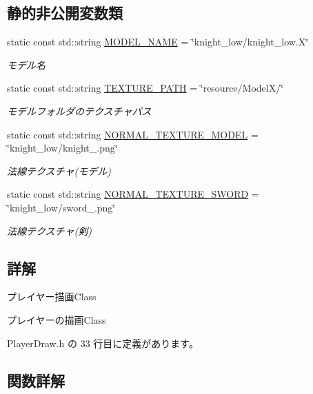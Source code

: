 \subsection*{静的非公開変数類}
\begin{DoxyCompactItemize}
\item 
static const std\+::string \mbox{\hyperlink{class_player_draw_a924cd73d9d8b1b2e662be2c79238354f}{M\+O\+D\+E\+L\+\_\+\+N\+A\+ME}} = \char`\"{}knight\+\_\+low/knight\+\_\+low.\+X\char`\"{}
\begin{DoxyCompactList}\small\item\em モデル名 \end{DoxyCompactList}\item 
static const std\+::string \mbox{\hyperlink{class_player_draw_a808cb174528d55fb35a35b161e262e16}{T\+E\+X\+T\+U\+R\+E\+\_\+\+P\+A\+TH}} = \char`\"{}resource/ModelX/\char`\"{}
\begin{DoxyCompactList}\small\item\em モデルフォルダのテクスチャパス \end{DoxyCompactList}\item 
static const std\+::string \mbox{\hyperlink{class_player_draw_a509edc24db83efdfeda88f12d1d6cc8c}{N\+O\+R\+M\+A\+L\+\_\+\+T\+E\+X\+T\+U\+R\+E\+\_\+\+M\+O\+D\+EL}} = \char`\"{}knight\+\_\+low/knight\+\_.\+png\char`\"{}
\begin{DoxyCompactList}\small\item\em 法線テクスチャ(モデル) \end{DoxyCompactList}\item 
static const std\+::string \mbox{\hyperlink{class_player_draw_aa64bacc93024e21558e2dd9227937bdb}{N\+O\+R\+M\+A\+L\+\_\+\+T\+E\+X\+T\+U\+R\+E\+\_\+\+S\+W\+O\+RD}} = \char`\"{}knight\+\_\+low/sword\+\_.\+png\char`\"{}
\begin{DoxyCompactList}\small\item\em 法線テクスチャ(剣) \end{DoxyCompactList}\end{DoxyCompactItemize}


\subsection{詳解}
プレイヤー描画\+Class 

プレイヤーの描画\+Class 

 Player\+Draw.\+h の 33 行目に定義があります。



\subsection{関数詳解}
\mbox{\label{class_player_draw_a8b9e8caa6bea7295f58a0aaddeb9458b}} 
